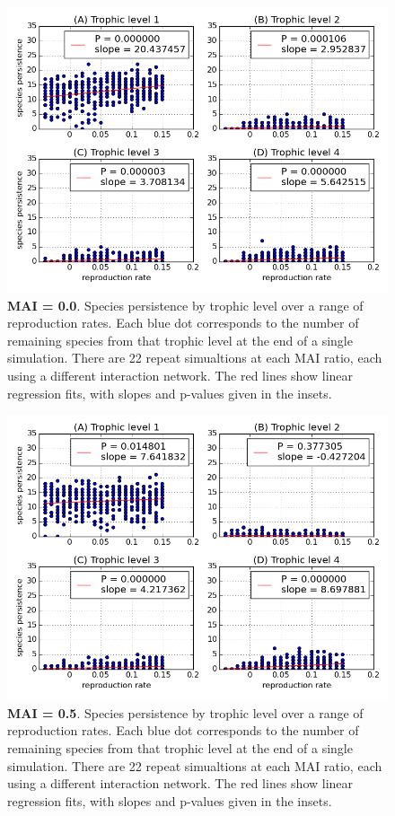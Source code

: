 \begin{figure}
	\centering
	\includegraphics[width=0.8\linewidth]{"figures/rr_species_richness_per_trophic_level_mai00"}
	\caption{\textbf{MAI = 0.0}. Species persistence by trophic level over a range of reproduction rates. Each blue dot corresponds to the number of remaining species from that trophic level at the end of a single simulation. There are 22 repeat simualtions at each MAI ratio, each using a different interaction network. The red lines show linear regression fits, with slopes and p-values given in the insets.}
	\label{fig:rr_species_per_trophic_level_mai0}
\end{figure}

\begin{figure}
	\centering
	\includegraphics[width=0.8\linewidth]{"figures/rr_species_richness_per_trophic_level_mai05"}
	\caption{\textbf{MAI = 0.5}. Species persistence by trophic level over a range of reproduction rates. Each blue dot corresponds to the number of remaining species from that trophic level at the end of a single simulation. There are 22 repeat simualtions at each MAI ratio, each using a different interaction network. The red lines show linear regression fits, with slopes and p-values given in the insets.}
	\label{fig:rr_species_per_trophic_level_mai05}
\end{figure}



